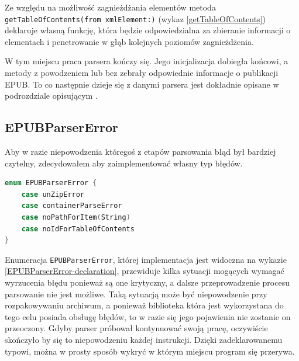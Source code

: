 Ze względu na możliwość zagnieżdżania elementów metoda \texttt{getTableOfContents(from xmlElement:)} (wykaz \ref{getTableOfContents}) deklaruje własną funkcję, która będzie odpowiedzialna za zbieranie informacji o elementach i penetrowanie w głąb kolejnych poziomów zagnieżdżenia.

W tym miejscu praca parsera kończy się. Jego inicjalizacja dobiegła końcowi, a metody z powodzeniem lub bez zebrały odpowiednie informacje o publikacji EPUB. To co następnie dzieje się z danymi parsera jest dokładnie opisane w podrozdziale opisującym .

\subsection{EPUBParserError}

Aby w razie niepowodzenia któregoś z etapów parsowania błąd był bardziej czytelny, zdecydowałem aby zaimplementować własny typ błędów.

\begin{lstlisting}[caption={Enumeracja \texttt{EPUBParserError}},language=swift,label=EPUBParserError-declaration]
enum EPUBParserError {
    case unZipError
    case containerParseError
    case noPathForItem(String)
    case noIdForTableOfContents
}
\end{lstlisting}

Enumeracja \texttt{EPUBParserError}, której implementacja jest widoczna na wykazie \ref{EPUBParserError-declaration}, przewiduje kilka sytuacji  mogących wymagać wyrzucenia błędu ponieważ są one krytyczny, a dalsze przeprowadzenie procesu parsowanie nie jest możliwe. Taką sytuacją może być niepowodzenie przy rozpakowywaniu archiwum, a ponieważ biblioteka która jest wykorzystana do tego celu posiada obsługę błędów, to w razie się jego pojawienia nie zostanie on przeoczony. Gdyby parser próbował kontynuować swoją pracę, oczywiście skończyło by się to niepowodzeniu każdej instrukcji. Dzięki zadeklarowanemu typowi, można w prosty sposób wykryć w którym miejscu program się przerywa.

